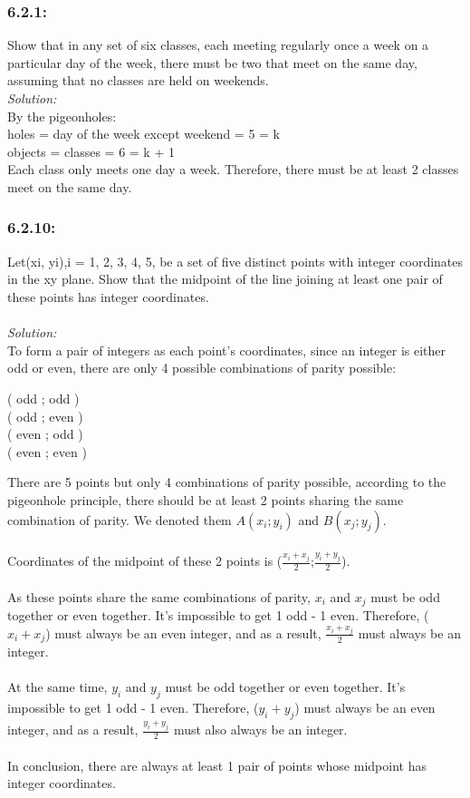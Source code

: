 \documentclass[a4paper]{article}
\begin{document}
\subsubsection*{6.2.1:}
Show that in any set of six classes, each meeting regularly once a week on a particular day of the week, there must be two that meet on the same day, assuming that no classes are held on weekends.\\
\textit{Solution:}\\
By the pigeonholes: \\
holes = day of the week except weekend = 5 = k \\
objects = classes = 6 = k + 1 \\
Each class only meets one day a week. Therefore, there must be at least 2 classes meet on the same day.
\subsubsection*{6.2.10:}
Let(xi, yi),i = 1, 2, 3, 4, 5, be a set of five distinct points with integer coordinates in the xy plane. Show that the midpoint of the line joining at least one pair of these points has integer coordinates.\\\\
\textit{Solution:}\\
To form a pair of integers as each point's coordinates, since an integer is either odd or even, there are only 4 possible combinations of parity possible:
\begin{center}
	( odd ; odd )\\
	( odd ; even )\\
	( even ; odd )\\
	( even ; even )\\
\end{center}
There are 5 points but only 4 combinations of parity possible, according to the pigeonhole principle, there should be at least 2 points sharing the same combination of parity. We denoted them $A(x_i;y_i)$ and $B(x_j;y_j)$.\\\\
Coordinates of the midpoint of these 2 points is ($\frac{x_i+x_j}{2}$;$\frac{y_i+y_j}{2}$).\\\\
As these points share the same combinations of parity, $x_i$ and $x_j$ must be odd together or even together. It's impossible to get 1 odd - 1 even. Therefore, ($x_i + x_j$) must always be an even integer, and as a result, $\frac{x_i+x_j}{2}$ must always be an integer.\\\\
At the same time, $y_i$ and $y_j$ must be odd together or even together. It's impossible to get 1 odd - 1 even. Therefore, ($y_i + y_j$) must always be an even integer, and as a result, $\frac{y_i+y_j}{2}$ must also always be an integer.\\\\
In conclusion, there are always at least 1 pair of points whose midpoint has integer coordinates.
\end{document}
